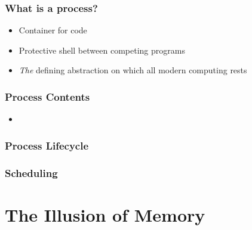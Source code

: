 \documentclass[pdftex]{beamer} %
\begin{document}
\begin{frame}
  \frametitle{What is a process?}
  \begin{itemize}
  \item Container for code
  \item Protective shell between competing programs
  \item \emph{The} defining abstraction on which all modern computing rests
  \end{itemize}
\end{frame}

\begin{frame}
  \frametitle{Process Contents}
  \begin{itemize}
  \item 
  \end{itemize}
\end{frame}

\begin{frame}
  \frametitle{Process Lifecycle}
  
\end{frame}

\begin{frame}
  \frametitle{Scheduling}
  
\end{frame}


\section{The Illusion of Memory}
\label{sec:memory}
\end{document}
